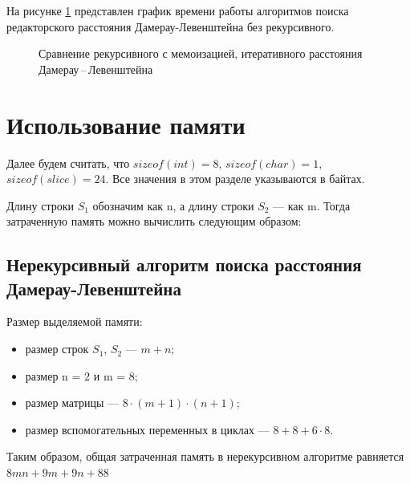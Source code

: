 \newpage

На рисунке \ref{graf:del-recno} представлен график времени работы алгоритмов поиска редакторского расстояния Дамерау-Левенштейна без рекурсивного.

\begin{figure}[ht!]
	\begin{center}
		
	\end{center}
	\caption{Сравнение рекурсивного с мемоизацией, итеративного расстояния Дамерау\,--\,Левенштейна}
	\label{graf:del-recno}
\end{figure}



\section{Использование памяти}

Далее будем считать, что $sizeof(int) = 8$, $sizeof(char) = 1$, $sizeof(slice) = 24$. Все значения в этом разделе указываются в байтах.

Длину строки $S_1$ обозначим как n, а длину строки $S_2$ --- как m. Тогда затраченную память можно вычислить следующим образом:

\subsection{Нерекурсивный алгоритм поиска расстояния Дамерау-Левенштейна}
Размер выделяемой памяти:
\begin{itemize}
	\item размер строк $S_1$, $S_2$ --- $m + n$;
	\item размер n = $2$ и m = $8$;
	\item размер матрицы --- $8 \cdot (m + 1) \cdot (n + 1)$;
	\item размер вспомогательных переменных в циклах --- $8 + 8 + 6 \cdot 8$.
\end{itemize}
Таким образом, общая затраченная память в нерекурсивном алгоритме равняется $8mn + 9m + 9n + 88$


